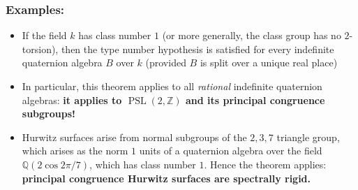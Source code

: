 \documentclass{beamer}
\begin{document}
\begin{frame}
	\frametitle{Examples:}
	\begin{itemize}
		\item If the field $k$ has class number $1$ (or more generally, the class group has no $2$-torsion), then the type number hypothesis is satisfied for every indefinite quaternion algebra $B$ over $k$ (provided $B$ is split over a unique real place) \pause
		\item In particular, this theorem applies to all  \emph{rational} indefinite quaternion algebras: \pause \textbf{it applies to $\operatorname{PSL}(2,\mathbb{Z})$ and its principal congruence subgroups!}  \pause
		\item Hurwitz surfaces arise from normal subgroups of the $2,3,7$ triangle group, which arises as the norm $1$ units of a quaternion algebra over the field $\mathbb{Q}(2 \cos 2 \pi / 7)$, which has class number $1$. Hence  the theorem applies: \textbf{principal congruence Hurwitz surfaces are spectrally rigid.}
	\end{itemize}
\end{frame}




\end{document}
